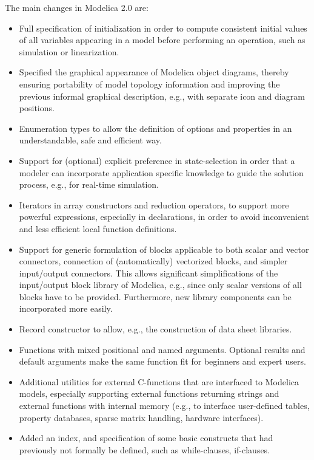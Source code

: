 \documentclass[10pt,a4paper]{report}
\begin{document}
The main changes in Modelica 2.0 are:

\begin{itemize}
\item
  Full specification of initialization in order to compute consistent
  initial values of all variables appearing in a model before performing
  an operation, such as simulation or linearization.
\item
  Specified the graphical appearance of Modelica object diagrams,
  thereby ensuring portability of model topology information and
  improving the previous informal graphical description, e.g., with
  separate icon and diagram positions.
\item
  Enumeration types to allow the definition of options and properties in
  an understandable, safe and efficient way.
\item
  Support for (optional) explicit preference in state-selection in order
  that a modeler can incorporate application specific knowledge to guide
  the solution process, e.g., for real-time simulation.
\item
  Iterators in array constructors and reduction operators, to support
  more powerful expressions, especially in declarations, in order to
  avoid inconvenient and less efficient local function definitions.
\item
  Support for generic formulation of blocks applicable to both scalar
  and vector connectors, connection of (automatically) vectorized
  blocks, and simpler input/output connectors. This allows significant
  simplifications of the input/output block library of Modelica, e.g.,
  since only scalar versions of all blocks have to be provided.
  Furthermore, new library components can be incorporated more easily.
\item
  Record constructor to allow, e.g., the construction of data sheet
  libraries.
\item
  Functions with mixed positional and named arguments. Optional results
  and default arguments make the same function fit for beginners and
  expert users.
\item
  Additional utilities for external C-functions that are interfaced to
  Modelica models, especially supporting external functions returning
  strings and external functions with internal memory (e.g., to
  interface user-defined tables, property databases, sparse matrix
  handling, hardware interfaces).
\item
  Added an index, and specification of some basic constructs that had
  previously not formally be defined, such as while-clauses, if-clauses.
\end{itemize}
\end{document}
